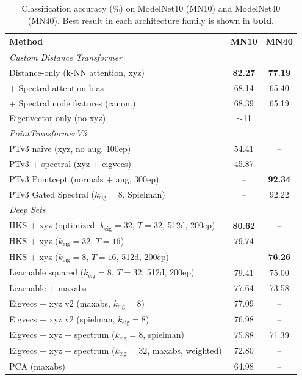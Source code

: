 \documentclass[11pt]{article}
\begin{document}
\begin{table}[ht]
\centering
\caption{Classification accuracy (\%) on ModelNet10 (MN10) and ModelNet40 (MN40). Best
result in each architecture family is shown in \textbf{bold}.}
\label{tab:main}
\begin{tabular}{lcc}
\toprule
\textbf{Method} & \textbf{MN10} & \textbf{MN40} \\
\midrule
\multicolumn{3}{l}{\emph{Custom Distance Transformer}} \\
\quad Distance-only (k-NN attention, xyz) & \textbf{82.27} & \textbf{77.19} \\
\quad + Spectral attention bias & 68.14 & 65.40 \\
\quad + Spectral node features (canon.) & 68.39 & 65.19 \\
\quad Eigenvector-only (no xyz) & ${\sim}$11 & -- \\
\midrule
\multicolumn{3}{l}{\emph{PointTransformerV3}} \\
\quad PTv3 naive (xyz, no aug, 100ep) & 54.41 & -- \\
\quad PTv3 + spectral (xyz + eigvecs) & 45.87 & -- \\
\quad PTv3 Pointcept (normals + aug, 300ep) & -- & \textbf{92.34} \\
\quad PTv3 Gated Spectral ($k_{\text{eig}}{=}8$, Spielman) & -- & 92.22 \\
\midrule
\multicolumn{3}{l}{\emph{Deep Sets}} \\
\quad HKS + xyz (optimized: $k_{\text{eig}}{=}32$, $T{=}32$, 512d, 200ep) & \textbf{80.62} & -- \\
\quad HKS + xyz ($k_{\text{eig}}{=}32$, $T{=}16$) & 79.74 & -- \\
\quad HKS + xyz ($k_{\text{eig}}{=}8$, $T{=}16$, 512d, 200ep) & -- & \textbf{76.26} \\
\quad Learnable squared ($k_{\text{eig}}{=}8$, $T{=}32$, 512d, 200ep) & 79.41 & 75.00 \\
\quad Learnable + maxabs & 77.64 & 73.58 \\
\quad Eigvecs + xyz v2 (maxabs, $k_{\text{eig}}{=}8$) & 77.09 & -- \\
\quad Eigvecs + xyz v2 (spielman, $k_{\text{eig}}{=}8$) & 76.98 & -- \\
\quad Eigvecs + xyz + spectrum ($k_{\text{eig}}{=}8$, spielman) & 75.88 & 71.39 \\
\quad Eigvecs + xyz + spectrum ($k_{\text{eig}}{=}32$, maxabs, weighted) & 72.80 & -- \\
\quad PCA (maxabs) & 64.98 & -- \\

\end{tabular}
\end{table}
\end{document}
